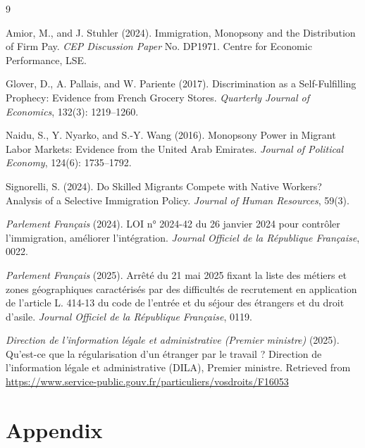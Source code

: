 \documentclass[10pt, a4paper]{article}
\begin{document}
\clearpage

\begin{thebibliography}{9}
\vspace{0.2cm}

Amior, M., and J. Stuhler (2024).
\newblock Immigration, Monopsony and the Distribution of Firm Pay.
\newblock \textit{CEP Discussion Paper} No. DP1971. Centre for Economic Performance, LSE.

Glover, D., A. Pallais, and W. Pariente (2017).
\newblock Discrimination as a Self-Fulfilling Prophecy: Evidence from French Grocery Stores.
\newblock \textit{Quarterly Journal of Economics}, 132(3): 1219--1260.

Naidu, S., Y. Nyarko, and S.-Y. Wang (2016).
\newblock Monopsony Power in Migrant Labor Markets: Evidence from the United Arab Emirates.
\newblock \textit{Journal of Political Economy}, 124(6): 1735--1792.

Signorelli, S. (2024).
\newblock Do Skilled Migrants Compete with Native Workers? Analysis of a Selective Immigration Policy.
\newblock \textit{Journal of Human Resources}, 59(3).

\textit{Parlement Français} (2024).
\newblock LOI n° 2024-42 du 26 janvier 2024 pour contrôler l'immigration, améliorer l'intégration.
\newblock \textit{Journal Officiel de la République Française}, 0022.

\textit{Parlement Français} (2025).
\newblock Arrêté du 21 mai 2025 fixant la liste des métiers et zones géographiques caractérisés par des difficultés de recrutement en application de l'article L. 414-13 du code de l'entrée et du séjour des étrangers et du droit d'asile.
\newblock \textit{Journal Officiel de la République Française}, 0119.

\textit{Direction de l'information légale et administrative (Premier ministre)} (2025).
\newblock Qu'est-ce que la régularisation d'un étranger par le travail ?
\newblock Direction de l'information légale et administrative (DILA), Premier ministre.
\newblock Retrieved from \url{https://www.service-public.gouv.fr/particuliers/vosdroits/F16053}
\end{thebibliography}

\clearpage
\section*{Appendix}
\end{document}
